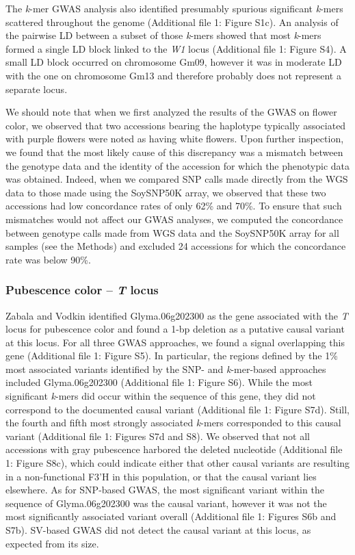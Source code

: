 \documentclass[doublespacing]{bmcart}
\begin{document}
The \textit{k}-mer GWAS analysis also identified presumably spurious significant
\textit{k}-mers scattered throughout the genome (Additional file 1: Figure
S1c). An analysis of the pairwise LD between a subset
of those \textit{k}-mers showed that most \textit{k}-mers formed a single LD block
linked to the \textit{W1} locus (Additional file 1: Figure S4). A small LD block
occurred on chromosome Gm09, however it was in moderate LD with the one on chromosome
Gm13 and therefore probably does not represent a separate locus.

We should note that when we first analyzed the results of the GWAS on flower
color, we observed that two accessions bearing the haplotype typically
associated with purple flowers were noted as having white flowers. Upon further
inspection, we found that the most likely cause of this discrepancy was a
mismatch between the genotype data and the identity of the accession for which
the phenotypic data was obtained. Indeed, when we compared SNP calls made
directly from the WGS data to those made using the SoySNP50K array, we observed
that these two accessions had low concordance rates of only 62\% and 70\%. To
ensure that such mismatches would not affect our GWAS analyses, we computed the
concordance between genotype calls made from WGS data and the SoySNP50K array
for all samples (see the Methods) and excluded 24 accessions for which the
concordance rate was below 90\%.

\subsubsection*{Pubescence color -- \textit{T} locus}

Zabala and Vodkin \cite{zabala2003} identified Glyma.06g202300 as the gene associated with the
\textit{T} locus for pubescence color and found a 1-bp deletion as a putative
causal variant at this locus. For all three GWAS approaches, we found a signal
overlapping this gene (Additional file 1: Figure S5). In
particular, the regions defined by the 1\% most associated variants
identified by the SNP- and \textit{k}-mer-based approaches included
Glyma.06g202300 (Additional file 1: Figure S6). While the most
significant \textit{k}-mers did occur within the sequence of this gene, they
did not correspond to the documented causal variant (Additional file 1: Figure
S7d).  Still, the fourth and fifth most strongly
associated \textit{k}-mers corresponded to this causal variant (Additional file 1: Figures
S7d and S8). We
observed that not all accessions with gray pubescence harbored the deleted
nucleotide (Additional file 1: Figure S8c), which could indicate
either that other causal variants are resulting in a non-functional F3’H in
this population, or that the causal variant lies elsewhere. As for SNP-based GWAS,
the most significant variant within the sequence of Glyma.06g202300 was the
causal variant, however it was not the most significantly associated variant
overall (Additional file 1: Figures S6b and
S7b). SV-based GWAS did not detect the causal variant
at this locus, as expected from its size.
\end{document}
